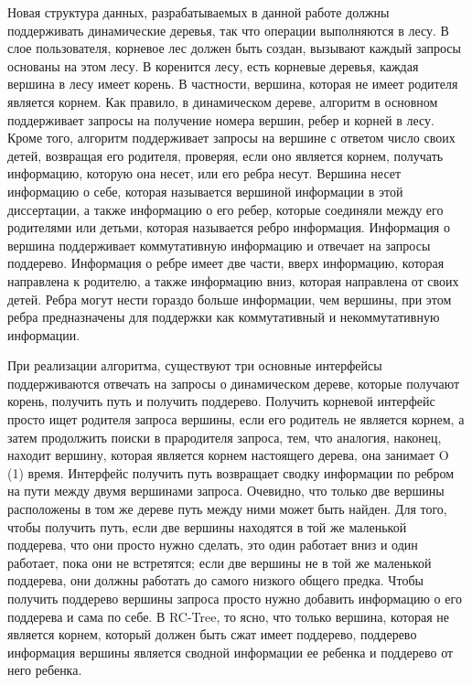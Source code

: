 \documentclass[specification,annotation]{itmo-student-thesis}
\newcommand{\revise}[1]{{\color{red!70!black} #1 }}
\begin{document}
\revise{
Новая структура данных, разрабатываемых в данной работе должны поддерживать динамические деревья, так что операции выполняются в лесу. В слое пользователя, корневое лес должен быть создан, вызывают каждый 
запросы основаны на этом лесу. В коренится лесу, есть корневые деревья, каждая вершина в лесу имеет корень. В частности, вершина, которая не имеет родителя является корнем. Как правило, в динамическом 
дереве, алгоритм в основном поддерживает запросы на получение номера вершин, ребер и корней в лесу. Кроме того, алгоритм поддерживает запросы на вершине с ответом число своих детей, возвращая его 
родителя, проверяя, если оно является корнем, получать информацию, которую она несет, или его ребра несут. Вершина несет информацию о себе, которая называется вершиной информации в этой диссертации, а 
также информацию о его ребер, которые соединяли между его родителями или детьми, которая называется ребро информация. Информация о вершина поддерживает коммутативную информацию и отвечает на запросы 
поддерево. Информация о ребре имеет две части, вверх информацию, которая направлена к родителю, а также информацию вниз, которая направлена от своих детей. Ребра могут нести гораздо больше информации, чем 
вершины, при этом ребра предназначены для поддержки как коммутативный и некоммутативную информации.
}

\revise{
При реализации алгоритма, существуют три основные интерфейсы поддерживаются отвечать на запросы о динамическом дереве, которые получают корень, получить путь и получить поддерево. Получить корневой 
интерфейс просто ищет родителя запроса вершины, если его родитель не является корнем, а затем продолжить поиски в прародителя запроса, тем, что аналогия, наконец, находит вершину, которая является корнем 
настоящего дерева, она занимает O (1) время. Интерфейс получить путь возвращает сводку информации по ребром на пути между двумя вершинами запроса. Очевидно, что только две вершины расположены в том же 
дереве путь между ними может быть найден. Для того, чтобы получить путь, если две вершины находятся в той же маленькой поддерева, что они просто нужно сделать, это один работает вниз и один работает, пока 
они не встретятся; если две вершины не в той же маленькой поддерева, они должны работать до самого низкого общего предка. Чтобы получить поддерево вершины запроса просто нужно добавить информацию о его 
поддерева и сама по себе. В RC-Tree, то ясно, что только вершина, которая не является корнем, который должен быть сжат имеет поддерево, поддерево информация вершины является сводной информации ее ребенка 
и поддерево от него ребенка.
}
\end{document}
